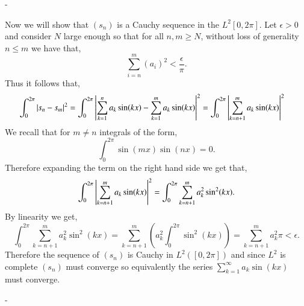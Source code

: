 \documentclass[12pt]{article}
\makeatletter
\theoremstyle{ex215}
\newcounter{probcount}
\newlength\probsep
\newlength\pshrinking
\newenvironment{problems}%
  {\ifhmode\unskip\par\fi\setcounter{probcount}{0}\probsep\parskip
  \sbox\@tempboxa{\textbf{9.}}\pshrinking\wd\@tempboxa\advance\pshrinking\labelsep
  \advance\linewidth -\pshrinking
  \advance\@totalleftmargin\pshrinking
  \advance\leftskip\pshrinking}%
  {\ifhmode\unskip \par\fi\advance\leftskip-\pshrinking}%
\renewenvironment{proof}[1][\proofname]{\par
  \pushQED{\qed}%
  \normalfont \topsep6\p@\@plus6\p@\relax
  \trivlist
  \@topsep \topsep
  \item[\hskip\labelsep
        \itshape
    #1\@addpunct{.}]\ignorespaces
}{%
  \popQED\endtrivlist\@endpefalse
}
\makeatother
\begin{document}
\begin{problems}
\begin{proof}
  Now we will show that $(s_n)$ is a Cauchy sequence in the $L^2[0, 2\pi]$. Let $\epsilon > 0$ and consider $N$ large enough so that for all $n, m \geq N$, without loss of generality $n \leq m$ we have that,
  \begin{equation*}
    \sum_{i = n}^m (a_i)^2 < \frac{\epsilon}{\pi}. 
  \end{equation*}
  Thus it follows that, 
  \begin{align*}
    \int_0^{2\pi}\abs{s_n - s_m}^2 =  \int_{0}^{2\pi} \abs{ \sum_{k=1}^n a_k\sin(kx) - \sum_{k=1}^m a_k\sin(kx) }^2
    &= \int_{0}^{2\pi} \abs{\sum_{k= n + 1}^m a_k\sin(kx) }^2
  \end{align*}
  We recall that for $m \neq n$ integrals of the form, 
  \begin{equation*}
    \int_0^{2\pi} \sin(mx)\sin(nx) = 0.
  \end{equation*}
  Therefore expanding the term on the right hand side we get that, 
  \begin{equation*}
    \int_{0}^{2\pi} \abs{\sum_{k= n + 1}^m a_k\sin(kx) }^2 = \int_{0}^{2\pi} \sum_{k= n + 1}^m a_k^2\sin^2(kx).
  \end{equation*}
  By linearity we get, 
  \begin{equation*}
    \int_{0}^{2\pi} \sum_{k= n + 1}^m a_k^2\sin^2(kx) = \sum_{k= n + 1}^m \left(a_k^2\int_{0}^{2\pi} \sin^2(kx)\right) =  \sum_{k= n + 1}^m a_k^2\pi < \epsilon. 
  \end{equation*}
  Therefore the sequence of $(s_n)$ is Cauchy in $L^2([0, 2\pi])$ and since $L^2$ is complete $(s_n)$ must converge so equivalently the series $\sum_{k=1}^\infty a_k\sin(kx)$ must converge. 
\end{proof}
\pagebreak







\end{problems}
\end{document}
